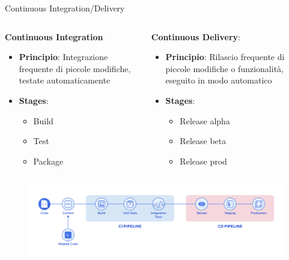 \begin{frame}{Continuous Integration/Delivery}
    \vspace{3mm}
    \begin{columns}[onlytextwidth]
        \begin{column}{0.45\textwidth}
            \textbf{Continuous Integration}
            \vspace{2mm}
            \begin{itemize}
                \item \textbf{Principio}: Integrazione frequente di piccole modifiche, testate automaticamente
                \vspace{2mm}
                \item \textbf{Stages}:
                \begin{itemize}
                    \item Build
                    \item Test
                    \item Package
                \end{itemize}
            \end{itemize}
        \end{column}
        \begin{column}{0.45\textwidth}
            \textbf{Continuous Delivery}:
            \vspace{2mm}
            \begin{itemize}
                \item \textbf{Principio}: Rilascio frequente di piccole modifiche o funzionalità, eseguito in modo automatico
                \vspace{2mm}
                \item \textbf{Stages}:
                \begin{itemize}
                    \item Release alpha
                    \item Release beta
                    \item Release prod
                \end{itemize}
            \end{itemize}
        \end{column}
    \end{columns}
    \begin{figure}[H]
        \includegraphics[width=1\textwidth]{img/ci-cd-pipeline.png}
    \end{figure}
\end{frame}

